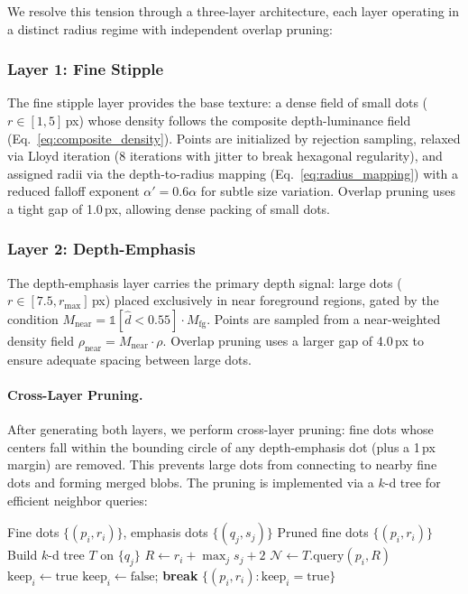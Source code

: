 We resolve this tension through a three-layer architecture, each layer
operating in a distinct radius regime with independent overlap
pruning:

\subsubsection{Layer 1: Fine Stipple}

The fine stipple layer provides the base texture: a dense field of
small dots ($r \in [1, 5]$\,px) whose density follows the composite
depth-luminance field (Eq.~\ref{eq:composite_density}). Points are
initialized by rejection sampling, relaxed via Lloyd iteration
(8 iterations with jitter to break hexagonal regularity), and
assigned radii via the depth-to-radius mapping
(Eq.~\ref{eq:radius_mapping}) with a reduced falloff exponent
$\alpha' = 0.6\alpha$ for subtle size variation. Overlap pruning
uses a tight gap of 1.0\,px, allowing dense packing of small dots.

\subsubsection{Layer 2: Depth-Emphasis}

The depth-emphasis layer carries the primary depth signal: large dots
($r \in [7.5, r_{\max}]$\,px) placed exclusively in near foreground
regions, gated by the condition
$M_{\text{near}} = \mathbb{1}[\hat{d} < 0.55] \cdot M_{\text{fg}}$.
Points are sampled from a near-weighted density field
$\rho_{\text{near}} = M_{\text{near}} \cdot \rho$. Overlap pruning
uses a larger gap of 4.0\,px to ensure adequate spacing between large
dots.

\paragraph{Cross-Layer Pruning.}
After generating both layers, we perform cross-layer pruning: fine
dots whose centers fall within the bounding circle of any
depth-emphasis dot (plus a 1\,px margin) are removed. This prevents
large dots from connecting to nearby fine dots and forming merged
blobs. The pruning is implemented via a $k$-d tree for efficient
neighbor queries:

\begin{algorithm}
\caption{Cross-Layer Overlap Pruning}
\label{alg:cross_prune}
\begin{algorithmic}[1]
\REQUIRE Fine dots $\{(p_i, r_i)\}$, emphasis dots $\{(q_j, s_j)\}$
\ENSURE Pruned fine dots $\{(p_i, r_i)\}$
\STATE Build $k$-d tree $T$ on $\{q_j\}$
    \STATE $R \leftarrow r_i + \max_j s_j + 2$ 
    \STATE $\mathcal{N} \leftarrow T.\text{query}(p_i, R)$
    \STATE $\text{keep}_i \leftarrow \text{true}$
            \STATE $\text{keep}_i \leftarrow \text{false}$;\; \textbf{break}
        \ENDIF
    \ENDFOR
\ENDFOR
\RETURN $\{(p_i, r_i) : \text{keep}_i = \text{true}\}$
\end{algorithmic}
\end{algorithm}

